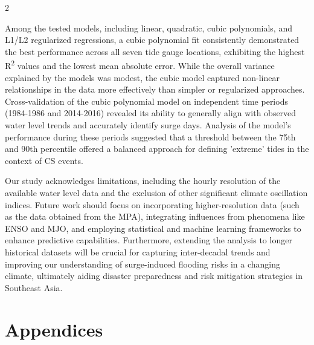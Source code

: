 \documentclass[12pt]{article}
\begin{document}
\begin{multicols}{2}
    \begin{paragraph}
        \noindent  Among the tested models, including linear, quadratic, cubic polynomials, and L1/L2 regularized regressions, a cubic polynomial fit consistently demonstrated the best performance across all seven tide gauge locations, exhibiting the highest R\textsuperscript{2} values and the lowest mean absolute error. While the overall variance explained by the models was modest, the cubic model captured non-linear relationships in the data more effectively than simpler or regularized approaches. Cross-validation of the cubic polynomial model on independent time periods (1984-1986 and 2014-2016) revealed its ability to generally align with observed water level trends and accurately identify surge days. Analysis of the model's performance during these periods suggested that a threshold between the 75th and 90th percentile offered a balanced approach for defining 'extreme' tides in the context of CS events.
    \end{paragraph}

    \begin{paragraph}
        \noindent Our study acknowledges limitations, including the hourly resolution of the available water level data and the exclusion of other significant climate oscillation indices. Future work should focus on incorporating higher-resolution data (such as the data obtained from the MPA), integrating influences from phenomena like ENSO and MJO, and employing statistical and machine learning frameworks to enhance predictive capabilities. Furthermore, extending the analysis to longer historical datasets will be crucial for capturing inter-decadal trends and improving our understanding of surge-induced flooding risks in a changing climate, ultimately aiding disaster preparedness and risk mitigation strategies in Southeast Asia.
    \end{paragraph}
    
\end{multicols}

\newpage


\newpage
\section*{Appendices}
\end{document}
